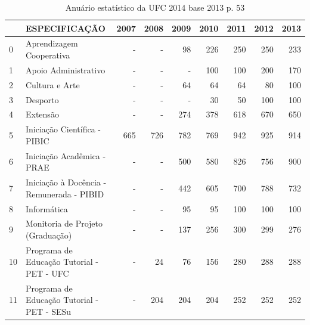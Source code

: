 \documentclass{report}
\begin{document}
\begin{table}[H]
\begin{tabular}{llrrrrrrr}
\toprule
{} &                               ESPECIFICAÇÃO &  2007 &  2008 &  2009 &  2010 &  2011 &  2012 &  2013 \\
\midrule
0  &                    Aprendizagem Cooperativa &     - &     - &    98 &   226 &   250 &   250 &   233 \\
1  &                        Apoio Administrativo &     - &     - &     - &   100 &   100 &   200 &   170 \\
2  &                              Cultura e Arte &     - &     - &    64 &    64 &    64 &    80 &   100 \\
3  &                                    Desporto &     - &     - &     - &    30 &    50 &   100 &   100 \\
4  &                                    Extensão &     - &     - &   274 &   378 &   618 &   670 &   650 \\
5  &                Iniciação Científica - PIBIC &   665 &   726 &   782 &   769 &   942 &   925 &   914 \\
6  &                  Iniciação Acadêmica - PRAE &     - &     - &   500 &   580 &   826 &   756 &   900 \\
7  &   Iniciação à Docência - Remunerada - PIBID &     - &     - &   442 &   605 &   700 &   788 &   732 \\
8  &                                 Informática &     - &     - &    95 &    95 &   100 &   100 &   100 \\
9  &            Monitoria de Projeto (Graduação) &     - &     - &   137 &   256 &   300 &   299 &   276 \\
10 &   Programa de Educação Tutorial - PET - UFC &     - &    24 &    76 &   156 &   280 &   288 &   288 \\
11 &  Programa de Educação Tutorial - PET - SESu &     - &   204 &   204 &   204 &   252 &   252 &   252 \\
\bottomrule
\end{tabular}
\caption{Anuário estatístico da UFC 2014 base 2013 p. 53}
\label{table:numero_bolsas_graduacao-ufc}
\end{table}



\end{document}
